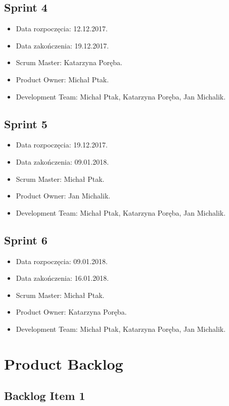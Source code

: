 \documentclass[a4paper]{article}
\begin{document}
\subsection{Sprint 4}

\begin{itemize}
\item Data rozpoczęcia: 12.12.2017.
\item Data zakończenia: 19.12.2017.
\item Scrum Master: Katarzyna Poręba.
\item Product Owner: Michał Ptak.
\item Development Team: Michał Ptak, Katarzyna Poręba, Jan Michalik.
\end{itemize}

\subsection{Sprint 5}

\begin{itemize}
\item Data rozpoczęcia: 19.12.2017.
\item Data zakończenia: 09.01.2018.
\item Scrum Master: Michał Ptak.
\item Product Owner: Jan Michalik.
\item Development Team: Michał Ptak, Katarzyna Poręba, Jan Michalik.
\end{itemize}

\subsection{Sprint 6}

\begin{itemize}
\item Data rozpoczęcia: 09.01.2018.
\item Data zakończenia: 16.01.2018.
\item Scrum Master: Michał Ptak.
\item Product Owner: Katarzyna Poręba.
\item Development Team: Michał Ptak, Katarzyna Poręba, Jan Michalik.
\end{itemize}

\section{Product Backlog}

\subsection{Backlog Item 1}
\end{document}
